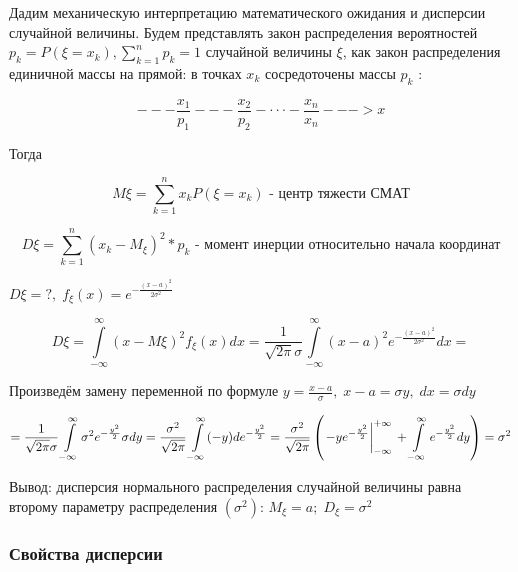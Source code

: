 \documentclass[a4paper,12pt]{report}
\begin{document}
	Дадим механическую интерпретацию математического ожидания и дисперсии случайной величины. Будем представлять закон распределения вероятностей $p_k = P(\xi = x_k), \sum\limits^n_{k=1}p_k = 1$ случайной величины $\xi$, как закон распределения единичной массы на прямой: в точках $x_k$ сосредоточены массы $p_k$ : 
	
	$$
	  ---\frac{x_1}{p_1}---\frac{x_2}{p_2}- \cdot \cdot \cdot -\frac{x_n}{x_n}--->x
	$$
	
	Тогда 
	
	$$
	  M\xi = \sum^n_{k=1} x_k P(\xi=x_k) \mbox{ - центр тяжести СМАТ}	
	$$ 

	$$
	  D\xi = \sum^n_{k=1} (x_k - M_\xi)^2 * p_k \mbox{ - момент инерции относительно начала координат}
	$$

 	 $D\xi = ?, \; f_\xi(x) = e^{-\frac{(x-a)^2}{2\sigma^2}}$

 	
 	$$
 	  D\xi = \int\limits^\infty_{-\infty}(x-M\xi)^2 f_\xi(x) dx
 	       = \frac{1}{\sqrt{2\pi}\sigma}\int\limits^\infty_{-\infty} (x-a)^2 e^{-\frac{(x-a)^2}{2\sigma^2}} dx
 	       = 
 	$$
 
 	Произведём замену переменной по формуле $y = \frac{x-a}{\sigma}, \; x - a = \sigma y, \; dx = \sigma dy$
 
 	$$
 	   = \frac{1}{\sqrt{2\pi}\sigma} \int\limits_{-\infty}^\infty \sigma^2 e^{-\frac{y^2}{2}} \sigma dy 
 	   = \frac{\sigma^2}{\sqrt{2\pi}}  \int\limits _{-\infty}^\infty (-y ) de^{-\frac{y^2}{2}} 
 	   = \frac{\sigma^2}{\sqrt{2\pi}} \left( \left. -ye^{-\frac{y^2}{2}} \right|^{+\infty}_{-\infty} \strut 
 	     + \int\limits_{-\infty}^\infty e^{-\frac{y^2}{2}} dy \right)
 	   = \sigma^2
 	 $$
 
	 Вывод: дисперсия нормального распределения случайной величины равна второму параметру распределения $(\sigma^2)$: $M_\xi = a; \; D_\xi = \sigma^2$

	


	
\subsubsection{Свойства дисперсии}
\end{document}
